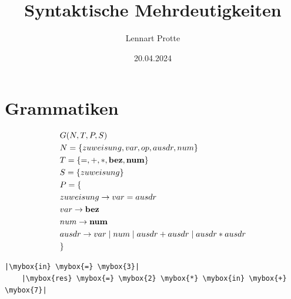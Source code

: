 \documentclass[t]{beamer}
\newcommand*{\mybox}[1]{\framebox{#1}}
\begin{document}

\title{Syntaktische Mehrdeutigkeiten}
\date{20.04.2024}
\author{Lennart Protte}
\frame{\titlepage}

\section{Grammatiken}
\begin{frame}[fragile]
\begin{align*}
    & G(N,T,P,S) \\
    & N= \{zuweisung, var, op, ausdr, num\} \\
    & T= \{=, +, *, \bold{bez}, \bold{num}\} \\
    & S= \{zuweisung\}  \\
    & P = \{ \\
    & zuweisung \rightarrow var = ausdr \\
    & var \rightarrow \bold{bez} \\
    & num \rightarrow \bold{num} \\
    & ausdr \rightarrow var \mid num \mid ausdr + ausdr \mid ausdr * ausdr \\
    & \}
\end{align*}
\begin{center}
\vspace{\fill}
\begin{lstlisting}[frame=single,escapechar=|]
    |\mybox{in} \mybox{=} \mybox{3}|
    |\mybox{res} \mybox{=} \mybox{2} \mybox{*} \mybox{in} \mybox{+} \mybox{7}|
\end{lstlisting}
\end{center}
\end{frame}
\end{document}
